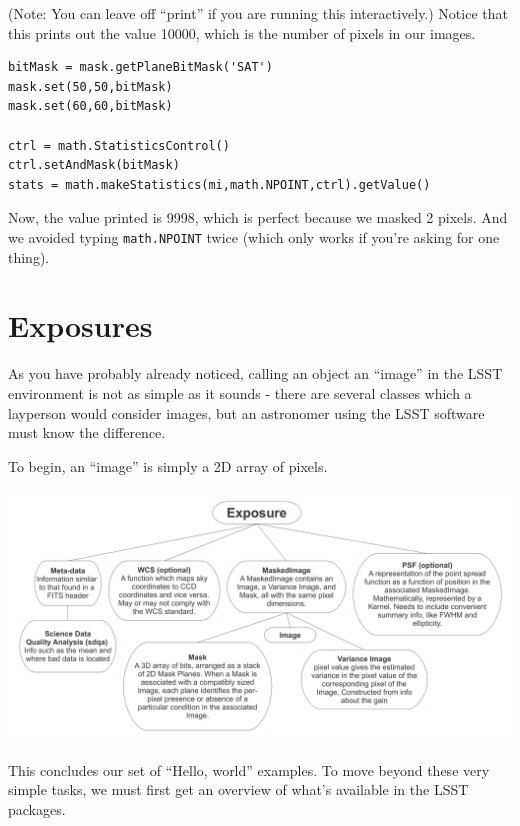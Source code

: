 (Note: You can leave off ``print'' if you are running this interactively.)  Notice that this prints out the value 10000, which is the number of pixels in our images.

\begin{verbatim}
bitMask = mask.getPlaneBitMask('SAT')
mask.set(50,50,bitMask)
mask.set(60,60,bitMask)

ctrl = math.StatisticsControl()
ctrl.setAndMask(bitMask)
stats = math.makeStatistics(mi,math.NPOINT,ctrl).getValue()
\end{verbatim}

Now, the value printed is 9998, which is perfect because we masked 2 pixels.  And we avoided typing \verb|math.NPOINT| twice (which only works if you're asking for one thing).

\section{Exposures}
As you have probably already noticed, calling an object an ``image'' in the LSST environment is not as simple as it sounds - there are several classes which a layperson would consider images, but an astronomer using the LSST software must know the difference.

To begin, an ``image'' is simply a 2D array of pixels.

\includegraphics[angle=90,scale=0.5]{./figures/exposure.pdf}




\vskip0.5in

This concludes our set of ``Hello, world'' examples.  To move beyond
these very simple tasks, we must first get an overview of what's
available in the LSST packages.

